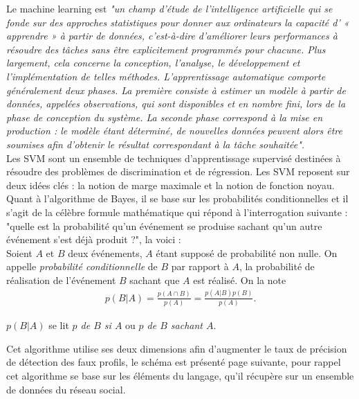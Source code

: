 \documentclass[12pt]{report}
\begin{document}
Le machine learning est \textit {"un champ d'étude de l'intelligence artificielle qui se fonde sur des approches statistiques pour donner aux ordinateurs la capacité d' « apprendre » à partir de données, c'est-à-dire d'améliorer leurs performances à résoudre des tâches sans être explicitement programmés pour chacune. Plus largement, cela concerne la conception, l'analyse, le développement et l'implémentation de telles méthodes. L'apprentissage automatique comporte généralement deux phases. La première consiste à estimer un modèle à partir de données, appelées observations, qui sont disponibles et en nombre fini, lors de la phase de conception du système. La seconde phase correspond à la mise en production : le modèle étant déterminé, de nouvelles données peuvent alors être soumises afin d'obtenir le résultat correspondant à la tâche souhaitée".} \\
Les SVM sont un ensemble de techniques d'apprentissage supervisé destinées à résoudre des problèmes de discrimination et de régression. Les SVM reposent sur deux idées clés : la notion de marge maximale et la notion de fonction noyau.\\
Quant à l'algorithme de Bayes, il se base sur les probabilités conditionnelles et il s'agit de la célèbre formule mathématique qui répond à l'interrogation suivante : "quelle est la probabilité qu’un événement se produise sachant qu’un autre événement s’est déjà produit ?", la voici : \\

\label{defpcond}
Soient $A$ et $B$ deux événements, $A$ étant supposé de probabilité non nulle. On appelle \emph{probabilité conditionnelle} de $B$ par rapport à $A$, la probabilité de réalisation de l'événement $B$ sachant que $A$ est réalisé. On la note
\begin{eqnarray*}
p(B|A) =  \frac{p(A\cap B)}{p(A)} = \frac{p(A|B)p(B)}{p(A)}.
\end{eqnarray*}
\begin{center}$p(B|A)$ se lit \emph{$p$ de $B$ si $A$} ou \emph{$p$ de $B$ sachant $A$}.
\end{center}

Cet algorithme utilise ses deux dimensions afin d'augmenter le taux de précision de détection des faux profils, le schéma est présenté page suivante, pour rappel cet algorithme se base sur les éléments du langage, qu'il récupère sur un ensemble de données du réseau social.
\end{document}
